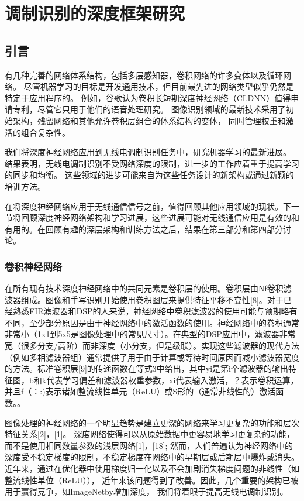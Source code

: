 \chapter{调制识别的深度框架研究}
\section{引言}

有几种完善的网络体系结构，包括多层感知器，卷积网络的许多变体以及循环网络。
 尽管机器学习的目标是开发通用技术，但目前最先进的网络类型似乎仍然是特定于应用程序的。 例如，谷歌认为卷积长短期深度神经网络（CLDNN）值得申请专利，尽管它只用于他们的语音处理研究。 
 图像识别领域的最新技术采用了初始架构，残留网络和其他允许卷积层组合的体系结构的变体，
 同时管理权重和激活的组合复杂性。 \par

我们将深度神经网络应用到无线电调制识别任务中，研究机器学习的最新进展。 结果表明，无线电调制识别不受网络深度的限制，进一步的工作应着重于提高学习的同步和均衡。 这些领域的进步可能来自为这些任务设计的新架构或通过新颖的培训方法。\par

在将深度神经网络应用于无线通信信号之前，值得回顾其他应用领域的现状。下一节将回顾深度神经网络架构和学习进展，这些进展可能对无线通信应用是有效的和有用的。在回顾有趣的深层架构和训练方法之后，结果在第三部分和第四部分讨论。 \par

\subsection{卷积神经网络}

在所有现有技术深度神经网络中的共同元素是卷积层的使用。卷积层由Nf卷积滤波器组成。图像和手写识别开始使用卷积图层来提供特征平移不变性[8]。对于已经熟悉FIR滤波器和DSP的人来说，神经网络中卷积滤波器的使用可能与预期略有不同，至少部分原因是由于神经网络中的激活函数的使用。神经网络中的卷积通常非常小（1x1到5x5是图像处理中的常见尺寸）。在典型的DSP应用中，滤波器非常宽（很多分支/高阶）而非深度（小分支，但是级联）。实现这些滤波器的现代方法（例如多相滤波器组）通常提供了用于由于计算或等待时间原因而减小滤波器宽度的方法。标准卷积层[9]的传递函数在等式3中给出，其中yi是第i个滤波器的输出特征图，b和k代表学习偏差和滤波器权重参数，xi代表输入激活，？表示卷积运算，并且f（：:)表示诸如整流线性单元（ReLU）或S形的（通常非线性的）激活函数。。\par

图像处理的神经网络的一个明显趋势是建立更深的网络来学习更复杂的功能和层次特征关系[2]，[1]。
深度网络使得可以从原始数据中更容易地学习更复杂的功能，而不是使用相同数量参数的浅层网络[1]，[18];
然而，人们普遍认为神经网络中的深度受不稳定梯度的限制，不稳定梯度在网络中的早期层或后期层中爆炸或消失。
近年来，通过在优化器中使用梯度归一化以及不会加剧消失梯度问题的非线性（如整流线性单位（ReLU）），
近年来该问题得到了改善。因此，几个重要的架构已被用于赢得竞争，如ImageNetby增加深度，
我们将着眼于提高无线电调制识别。\par

